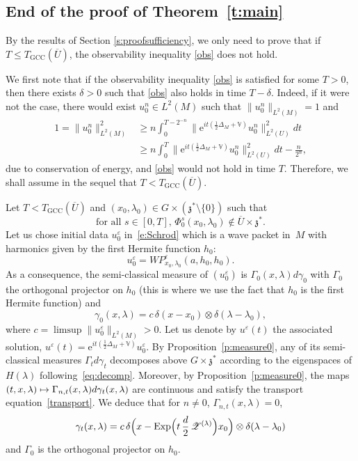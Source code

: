 \documentclass[10pt]{amsart}
\let\mathcal\mathscr
\newcommand\mto{\mathchoice{\longmapsto}{\mapsto}{\mapsto}{\mapsto}}
\newcommand{\rme}{\mathrm{e}}
\newcommand{\GCC}{\mathrm{GCC}}
\DeclareMathOperator{\Exp}{Exp}
\theoremstyle{plain}
\theoremstyle{definition}
\let\eps\varepsilon
\def\bbV{{\mathbb V}}
\begin{document}
\subsection{End of the proof of Theorem~\ref{t:main}} By the results of Section \ref{s:proofsufficiency}, we only need to prove that if $T\leq T_\GCC(\overline{U})$, the observability inequality \eqref{obs} does not hold.

We first note that if the observability inequality \eqref{obs} is satisfied for some $T>0$, then there exists $\delta>0$ such that \eqref{obs} also holds in time $T-\delta$. Indeed, if it were not the case, there would exist $u_0^n\in L^2(M)$ such that $\|u_0^n\|_{L^2(M)}=1$ and
\begin{align*}
1=\|u_0^n\|_{L^2(M)}^2&\geq n\int_0^{T-2^{-n}} \bigl\| \rme^{it(\frac12 \Delta_M+\bbV)} u_0^n\bigr\|^2_{L^2(U)} dt\\
&\geq n\int_0^{T} \bigl\| \rme^{it(\frac12 \Delta_M+\bbV)} u_0^n\bigr\|^2_{L^2(U)} dt-\frac{n}{2^n},
\end{align*}
due to conservation of energy, and \eqref{obs} would not hold in time $T$. Therefore, we shall assume in the sequel that $T<T_\GCC(\overline{U})$.

Let $T<T_\GCC(\overline{U})$ and $(x_0,\lambda_0)\in G\times (\mathfrak z^*\setminus\{0\})$ such that
\begin{equation}\label{e:hypfermee}
\text{for all $s\in [0,T]$, \ $\Phi_0^s(x_0,\lambda_0)\notin \overline{U}\times \mathfrak z^*$.}
\end{equation}
Let us chose initial data $u^\eps_0$ in~\eqref{e:Schrod} which is a wave packet in~$M$ with harmonics given by the first Hermite function $h_0$:
\[
u^\eps_0=WP^\eps_{x_0,\lambda_0}(a,h_0,h_0).
\]
As a consequence, the semi-classical measure of $(u^\eps_0)$ is $\Gamma_0(x,\lambda) d\gamma_0$ with $\Gamma_0$ the orthogonal projector on $h_0$ (this is where we use the fact that $h_0$ is the first Hermite function) and
\[
\gamma_0(x,\lambda)=c \, \delta(x-x_0)\otimes \delta(\lambda-\lambda_0),
\]
where $c=\limsup \| u^\eps_0\|_{L^2(M)}>0 $.
Let us denote by $u^\eps(t)$ the associated solution, $u^\eps(t)= \rme^{it(\frac12 \Delta_M+\bbV)} u^\eps_0$. By Proposition~\ref{p:measure0}, any of its semi-classical measures $\Gamma_t d\gamma_t$ decomposes above $G\times \mathfrak z^*$ according to the eigenspaces of $H(\lambda)$ following~\eqref{eq:decomp}.
Moreover, by Proposition~\ref{p:measure0},
the maps $(t,x,\lambda)\mto \Gamma_{n,t}(x,\lambda) d\gamma_t(x,\lambda)$ are continuous and satisfy the transport equation~\eqref{transport}.
We deduce that for $n\not=0$, $\Gamma_{n,t}(x,\lambda)=0$,
\begin{equation}\label{eq:gammat}
\gamma_t (x,\lambda)= c \, \delta\Bigl(x-\Exp \Bigl(t\,\frac d2\,\mathcal Z^{(\lambda)} \Bigr)x_0\Bigr)\otimes \delta(\lambda-\lambda_0)
\end{equation}
and $\Gamma_{0}$ is the orthogonal projector on $h_0$.
\end{document}
